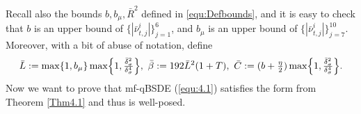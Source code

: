 \documentclass[10pt,a4paper]{article}
\newcommand{\bL}{\bar{L}}
\newcommand{\bC}{\bar{C}}
\newcommand{\bR}{\bar{R}}
\theoremstyle{plain}
\newtheorem{Lemma}[Theorem]{Lemma}
\theoremstyle{definition}
\numberwithin{equation}{section}
\begin{document}
   
Recall also the bounds $b,b_{\mu}, \bR^2$ defined in \eqref{equ:Defbounds}, and it is easy to check that $b$ is an upper bound of $\{|\bar{\nu}^i_{t,j}|\}_{j=1}^6$, and $b_\mu$ is an upper bound of $\{|\bar{\nu}^i_{t,j}|\}_{j=7}^{10}$. Moreover, with a bit of abuse of notation, define
\begin{align*}
\bL := \max\{1,b_{\mu}\}\max\Bigl\{1  ,  \tfrac{\bar{\delta}_{\sigma}^{2}}{\delta_{\sigma}^{4}}\Bigr\}, \ 
\bar \beta := 192 \bar{L}^{2}(1+T), \ 
\bC := (b+\tfrac{\eta}{2})\max\Bigl\{1 ,  \tfrac{\bar{\delta}_{\sigma}^{2}}{\delta_{\sigma}^{4}}\Bigr\}. 
\end{align*}
\noindent
Now we want to prove that mf-qBSDE (\ref{equ:4.1}) satisfies the form from Theorem \ref{Thm4.1} and thus is well-posed.


\end{document}
